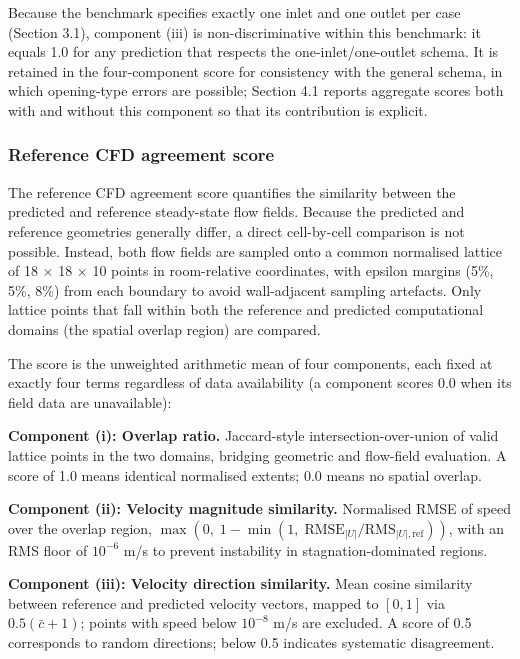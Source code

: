 \documentclass[preprint,12pt,number]{elsarticle}
\begin{document}
Because the benchmark specifies exactly one inlet and one outlet per case (Section 3.1), component (iii) is non-discriminative within this benchmark: it equals 1.0 for any prediction that respects the one-inlet/one-outlet schema. It is retained in the four-component score for consistency with the general schema, in which opening-type errors are possible; Section 4.1 reports aggregate scores both with and without this component so that its contribution is explicit.

\subsubsection{Reference CFD agreement score}


The reference CFD agreement score quantifies the similarity between the predicted and reference steady-state flow fields. Because the predicted and reference geometries generally differ, a direct cell-by-cell comparison is not possible. Instead, both flow fields are sampled onto a common normalised lattice of 18 $\times$ 18 $\times$ 10 points in room-relative coordinates, with epsilon margins (5\%, 5\%, 8\%) from each boundary to avoid wall-adjacent sampling artefacts. Only lattice points that fall within both the reference and predicted computational domains (the spatial overlap region) are compared.

The score is the unweighted arithmetic mean of four components, each fixed at exactly four terms regardless of data availability (a component scores 0.0 when its field data are unavailable):

\textbf{Component (i): Overlap ratio.} Jaccard-style intersection-over-union of valid lattice points in the two domains, bridging geometric and flow-field evaluation. A score of 1.0 means identical normalised extents; 0.0 means no spatial overlap.

\textbf{Component (ii): Velocity magnitude similarity.} Normalised RMSE of speed over the overlap region, $\max(0,\; 1 - \min(1,\; \text{RMSE}_{|U|} / \text{RMS}_{|U|,\text{ref}}))$, with an RMS floor of $10^{-6}$ m/s to prevent instability in stagnation-dominated regions.

\textbf{Component (iii): Velocity direction similarity.} Mean cosine similarity between reference and predicted velocity vectors, mapped to $[0,1]$ via $0.5(\bar{c}+1)$; points with speed below $10^{-8}$ m/s are excluded. A score of 0.5 corresponds to random directions; below 0.5 indicates systematic disagreement.
\end{document}
